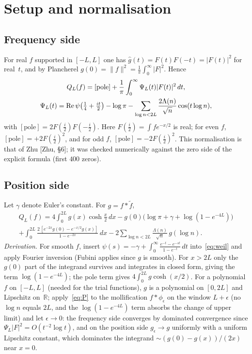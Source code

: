 \documentclass[11pt]{amsart}
\newcommand{\R}{\mathbb{R}}
\newcommand{\re}{\operatorname{Re}}
\newcommand{\pole}{\mathrm{pole}}
\theoremstyle{definition}
\theoremstyle{remark}
\numberwithin{equation}{section}
\begin{document}
\section{Setup and normalisation}\label{sec:setup}

\subsection{Frequency side}
For real $f$ supported in $[-L,L]$ one has $\hat g(t)=F(t)F(-t)=|F(t)|^2$ for real~$t$, and by Plancherel $g(0)=\|f\|^2=\frac1\pi\int_0^\infty|F|^2$. Hence
\begin{gather}\label{eq:freq}
Q_L(f)=[\pole]+\frac1\pi\int_0^\infty\Psi_L(t)|F(t)|^2\,dt,\\
\Psi_L(t)=\re\psi\bigl(\tfrac14+\tfrac{it}2\bigr)-\log\pi-\sum_{\log n<2L}\frac{2\Lambda(n)}{\sqrt n}\cos(t\log n),\notag
\end{gather}
with $[\pole]=2F(\tfrac i2)F(-\tfrac i2)$. Here $F(\tfrac i2)=\int fe^{-x/2}$ is real; for even $f$, $[\pole]=+2F(\tfrac i2)^2$, and for odd $f$, $[\pole]=-2F(\tfrac i2)^2$. This normalisation is that of Zhu [Zhu, \S6]; it was checked numerically against the zero side of the explicit formula (first $400$ zeros).

\subsection{Position side}
Let $\gamma$ denote Euler's constant. For $g=f*\tilde f$,
\begin{multline}\label{eq:P}
Q_L(f)=4\int_0^{2L}g(x)\cosh\tfrac x2\,dx-g(0)\bigl(\log\pi+\gamma+\log(1-e^{-4L})\bigr)\\
+\int_0^{2L}\frac{2\,[e^{-2x}g(0)-e^{-x/2}g(x)]}{1-e^{-2x}}\,dx-2\sum_{\log n<2L}\frac{\Lambda(n)}{\sqrt n}\,g(\log n).
\end{multline}
\emph{Derivation.} For smooth $f$, insert $\psi(s)=-\gamma+\int_0^\infty\frac{e^{-t}-e^{-st}}{1-e^{-t}}\,dt$ into~\eqref{eq:weil} and apply Fourier inversion (Fubini applies since $g$ is smooth). For $x>2L$ only the $g(0)$ part of the integrand survives and integrates in closed form, giving the term $\log(1-e^{-4L})$; the pole term gives $4\int_0^{2L}g\cosh(x/2)$. For a polynomial $f$ on $[-L,L]$ (needed for the trial functions), $g$ is a polynomial on $[0,2L]$ and Lipschitz on~$\R$; apply~\eqref{eq:P} to the mollification $f*\phi_\epsilon$ on the window $L+\epsilon$ (no $\log n$ equals $2L$, and the $\log(1-e^{-4L})$ term absorbs the change of upper limit) and let $\epsilon\to0$: the frequency side converges by dominated convergence since $\Psi_L|F|^2=O(t^{-2}\log t)$, and on the position side $g_\epsilon\to g$ uniformly with a uniform Lipschitz constant, which dominates the integrand $\sim(g(0)-g(x))/(2x)$ near $x=0$.
\end{document}
